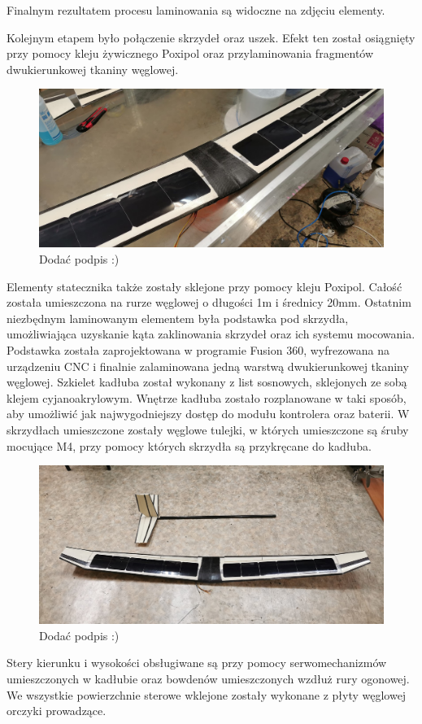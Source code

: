 \documentclass[12pt, a4paper]{article}
\begin{document}
Finalnym rezultatem procesu laminowania są widoczne na zdjęciu elementy.

Kolejnym etapem było połączenie skrzydeł oraz uszek. Efekt ten został osiągnięty przy pomocy kleju żywicznego Poxipol oraz przylaminowania fragmentów dwukierunkowej tkaniny węglowej.
 \begin{figure}[ht]
    \centering
    \includegraphics[width=1\textwidth]{budowa12}
    \caption{Dodać podpis :)}
\end{figure}
Elementy statecznika także zostały sklejone przy pomocy kleju Poxipol. Całość została umieszczona na rurze węglowej o długości 1m i średnicy 20mm.
 Ostatnim niezbędnym laminowanym elementem była podstawka pod skrzydła, umożliwiająca uzyskanie kąta zaklinowania skrzydeł oraz ich systemu mocowania. Podstawka została zaprojektowana w programie Fusion 360, wyfrezowana na urządzeniu CNC i finalnie zalaminowana jedną warstwą dwukierunkowej tkaniny węglowej.
Szkielet kadłuba został wykonany z list sosnowych, sklejonych ze sobą klejem cyjanoakrylowym. Wnętrze kadłuba zostało rozplanowane w taki sposób, aby umożliwić jak najwygodniejszy dostęp do modułu kontrolera oraz baterii. W skrzydłach umieszczone zostały węglowe tulejki, w których umieszczone są śruby mocujące M4, przy pomocy których skrzydła są przykręcane do kadłuba. 
 \begin{figure}[ht]
    \centering
    \includegraphics[width=1\textwidth]{budowa13}
    \caption{Dodać podpis :)}
\end{figure}
Stery kierunku i wysokości obsługiwane są przy pomocy serwomechanizmów umieszczonych w kadłubie oraz bowdenów umieszczonych wzdłuż rury ogonowej. We wszystkie powierzchnie sterowe wklejone zostały wykonane z płyty węglowej orczyki prowadzące. 
\end{document}
